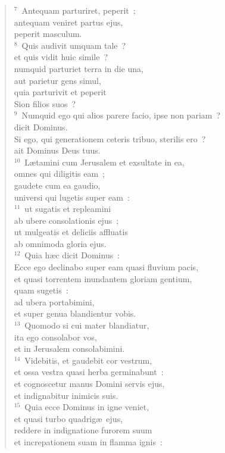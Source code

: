 \begin{verse}
${}^{7}$~Antequam parturiret, peperit~;\\ antequam veniret partus ejus,\\ peperit masculum.\\
${}^{8}$~Quis audivit umquam tale~?\\ et quis vidit huic simile~?\\ numquid parturiet terra in die una,\\ aut parietur gens simul,\\ quia parturivit et peperit\\ Sion filios suos~?\\
${}^{9}$~Numquid ego qui alios parere facio, ipse non pariam~?\\ dicit Dominus.\\ Si ego, qui generationem ceteris tribuo, sterilis ero~?\\ ait Dominus Deus tuus.\\
${}^{10}$~L\ae tamini cum Jerusalem et exsultate in ea,\\ omnes qui diligitis eam~;\\ gaudete cum ea gaudio,\\ universi qui lugetis super eam~:\\
${}^{11}$~ut sugatis et repleamini\\ ab ubere consolationis ejus~;\\ ut mulgeatis et deliciis affluatis\\ ab omnimoda gloria ejus.\\
${}^{12}$~Quia h\ae c dicit Dominus~:\\ Ecce ego declinabo super eam quasi fluvium pacis,\\ et quasi torrentem inundantem gloriam gentium,\\ quam sugetis~:\\ ad ubera portabimini,\\ et super genua blandientur vobis.\\
${}^{13}$~Quomodo si cui mater blandiatur,\\ ita ego consolabor vos,\\ et in Jerusalem consolabimini.\\
${}^{14}$~Videbitis, et gaudebit cor vestrum,\\ et ossa vestra quasi herba germinabunt~:\\ et cognoscetur manus Domini servis ejus,\\ et indignabitur inimicis suis.\\
${}^{15}$~Quia ecce Dominus in igne veniet,\\ et quasi turbo quadrig\ae\ ejus,\\ reddere in indignatione furorem suum\\ et increpationem suam in flamma ignis~:\\

\end{verse}
